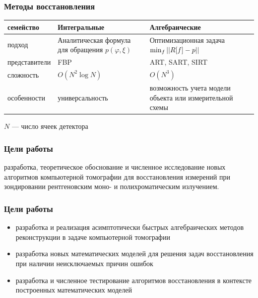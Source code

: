 \documentclass[12pt]{beamer}
\begin{document}
\begingroup
\small
\begin{frame}
\frametitle{Методы восстановления}
\begin{tabular}{p{} | p{} p{}}
\hspace{-1cm} семейство & Интегральные & Алгебраические \\ \hline
\hspace{-1cm} подход & Аналитическая формула для обращения $p(\varphi, \xi)$ & Оптимизационная задача $\min_{f} \left|\left| R[f] - p \right|\right|$\\ \hline
\hspace{-1cm} представители & FBP & ART, SART, SIRT \\ \hline
\hspace{-1cm} сложность & $O(N^2 \log N)$ & $O(N^3)$ \\ \hline
\hspace{-1cm} особенности & универсальность & возможность учета \hspace{1cm} модели объекта или измерительной схемы
\end{tabular}

$N$ --- число ячеек детектора
\end{frame}
\endgroup


\begin{frame}
\frametitle{Цели работы}

разработка, теоретическое обоснование и численное исследование новых алгоритмов компьютерной томографии для восстановления измерений при зондировании рентгеновским моно- и полихроматическим излучением.
\end{frame}

\begin{frame}
\frametitle{Цели работы}
\begin{itemize}
\item разработка и реализация асимптотически быстрых алгебраических методов реконструкции в задаче компьютерной томографии
\item разработка новых математических моделей для решения задач восстановления при наличии неисключаемых причин ошибок
\item разработка и численное тестирование алгоритмов восстановления в контексте построенных математических моделей
\end{itemize}
\end{frame}
\end{document}
